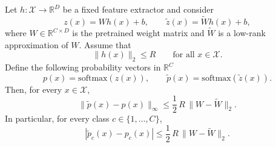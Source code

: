 \documentclass[twoside,leqno,onecolumn]{article}
\begin{document}
\begin{theorem}
Let $h:\mathcal{X} \to \mathbb{R}^D$ be a fixed feature extractor and consider
\begin{equation}
z(x) = W h(x) + b, 
\qquad 
\widetilde{z}(x) = \widetilde{W} h(x) + b,
\end{equation}
where $W \in \mathbb{R}^{C \times D}$ is the pretrained weight matrix and $\widetilde{W}$ is a low-rank approximation of $W$. Assume that
\begin{equation}
\|h(x)\|_2 \le R \qquad \text{for all } x \in \mathcal{X}.
\end{equation}
Define the following probability vectors in $\mathbb{R}^C$
\begin{equation}
p(x) = \mathrm{softmax}(z(x)), 
\qquad 
\widetilde{p}(x) = \mathrm{softmax}(\widetilde{z}(x)).
\end{equation}
Then, for every $x \in \mathcal{X}$,
\begin{equation}
\|\widetilde{p}(x) - p(x)\|_\infty
\le
\frac{1}{2} \, R \, \|W - \widetilde{W}\|_2.
\end{equation}
In particular, for every class $c\in\{1,\ldots,C\}$,
\begin{equation}
|\widetilde{p}_c(x) - p_c(x)|
\le
\frac{1}{2} \, R \, \| W- \widetilde{W}\|_2.
\end{equation}
\end{theorem}
\end{document}
